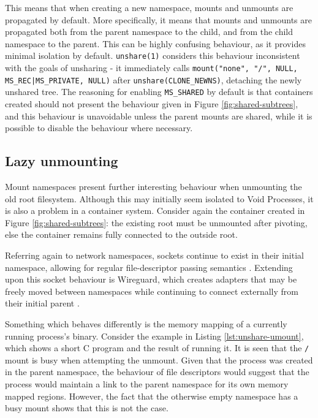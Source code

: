 \documentclass[12pt,a4paper,twoside]{report}
\begin{document}

This means that when creating a new namespace, mounts and unmounts are propagated by default. More specifically, it means that mounts and unmounts are propagated both from the parent namespace to the child, and from the child namespace to the parent. This can be highly confusing behaviour, as it provides minimal isolation by default. \texttt{unshare(1)} considers this behaviour inconsistent with the goals of unsharing - it immediately calls \texttt{mount("none", "/", NULL, MS\_REC|MS\_PRIVATE, NULL)} after \texttt{unshare(CLONE\_NEWNS)}, detaching the newly unshared tree. The reasoning for enabling \texttt{MS\_SHARED} by default is that containers created should not present the behaviour given in Figure \ref{fig:shared-subtrees}, and this behaviour is unavoidable unless the parent mounts are shared, while it is possible to disable the behaviour where necessary.

\subsection{Lazy unmounting}

Mount namespaces present further interesting behaviour when unmounting the old root filesystem. Although this may initially seem isolated to Void Processes, it is also a problem in a container system. Consider again the container created in Figure \ref{fig:shared-subtrees}: the existing root must be unmounted after pivoting, else the container remains fully connected to the outside root.

Referring again to network namespaces, sockets continue to exist in their initial namespace, allowing for regular file-descriptor passing semantics \citep{biederman_re_2007}. Extending upon this socket behaviour is Wireguard, which creates adapters that may be freely moved between namespaces while continuing to connect externally from their initial parent \citep[§7.3]{donenfeld_wireguard_2017}.

Something which behaves differently is the memory mapping of a currently running process's binary. Consider the example in Listing \ref{lst:unshare-umount}, which shows a short C program and the result of running it. It is seen that the \texttt{/} mount is busy when attempting the unmount. Given that the process was created in the parent namespace, the behaviour of file descriptors would suggest that the process would maintain a link to the parent namespace for its own memory mapped regions. However, the fact that the otherwise empty namespace has a busy mount shows that this is not the case.
\end{document}
